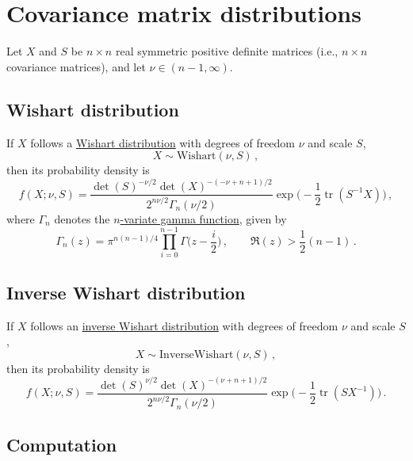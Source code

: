 \documentclass[12pt]{article}
\DeclareMathOperator{\tr}{tr}
\begin{document}
\section{Covariance matrix distributions}

Let $X$ and $S$ be $n \times n$ real symmetric positive definite matrices
(i.e., $n \times n$ covariance matrices), and let $\nu \in (n - 1, \infty)$.

\subsection{Wishart distribution}

If $X$ follows a
\href{https://mc-stan.org/docs/2_27/functions-reference/wishart-distribution.html}{Wishart distribution}
with degrees of freedom $\nu$ and scale $S$,
\begin{equation}
X \sim \mathrm{Wishart}(\nu,S)\,,
\end{equation}
then its probability density is
\begin{equation}
f(X;\nu,S) = \frac{\det(S)^{-\nu / 2} \det(X)^{-(-\nu + n + 1) / 2}}{2^{n \nu / 2} \Gamma_{n}(\nu / 2)} \exp\Big(-\frac{1}{2} \tr(S^{-1} X)\Big)\,,
\end{equation}
where $\Gamma_{n}$ denotes the
\href{https://en.wikipedia.org/wiki/Multivariate_gamma_function}{$n$-variate gamma function},
given by
\begin{equation}
\Gamma_{n}(z) = \pi^{n (n - 1) / 4} \prod_{i=0}^{n-1} \Gamma\Big(z - \frac{i}{2}\Big)\,,\qquad \Re(z) > \frac{1}{2}(n - 1)\,.
\end{equation}

\subsection{Inverse Wishart distribution}

If $X$ follows an
\href{https://mc-stan.org/docs/2_27/functions-reference/inverse-wishart-distribution.html}{inverse Wishart distribution}
with degrees of freedom $\nu$ and scale $S$,
\begin{equation}
X \sim \mathrm{InverseWishart}(\nu,S)\,,
\end{equation}
then its probability density is
\begin{equation}
f(X;\nu,S) = \frac{\det(S)^{\nu / 2} \det(X)^{-(\nu + n + 1) / 2}}{2^{n \nu / 2} \Gamma_{n}(\nu / 2)} \exp\Big(-\frac{1}{2} \tr(S X^{-1})\Big)\,.
\end{equation}

\subsection{Computation}
\end{document}
